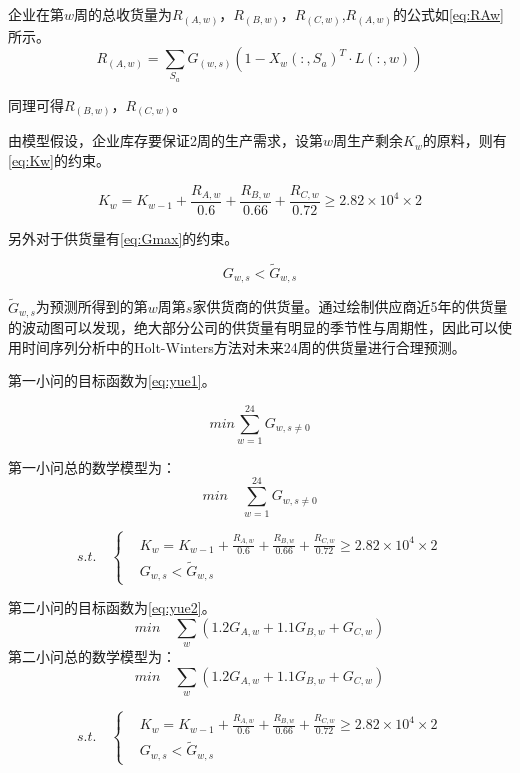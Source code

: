 \documentclass[withoutpreface,bwprint]{cumcmthesis} %
\begin{document}
企业在第$w$周的总收货量为$R_(A,w)$，$R_(B,w)$，$R_(C,w)$,$R_(A,w)$的公式如\cref{eq:RAw}所示。
\begin{equation}
R_(A,w)=\sum\limits_{S_a} G_(w,s)(1-X_w(:,S_a)^T\cdot L(:,w))
\label{eq:RAw}
\end{equation}

同理可得$R_(B,w)$，$R_(C,w)$。

由模型假设，企业库存要保证2周的生产需求，设第$w$周生产剩余$K_w$的原料，则有\cref{eq:Kw}的约束。

\begin{equation}
K_w=K_{w-1}+\frac{R_{A,w}}{0.6}+\frac{R_{B,w}}{0.66}+\frac{R_{C,w}}{0.72}\ge 2.82\times 10^4\times 2
\label{eq:Kw}
\end{equation}

另外对于供货量有\cref{eq:Gmax}的约束。

\begin{equation}
G_{w,s}<\widetilde{G}_{w,s}
\label{eq:Gmax}
\end{equation}

$\widetilde{G}_{w,s}$为预测所得到的第$w$周第$s$家供货商的供货量。通过绘制供应商近5年的供货量的波动图可以发现，绝大部分公司的供货量有明显的季节性与周期性，因此可以使用时间序列分析中的Holt-Winters方法对未来24周的供货量进行合理预测。

第一小问的目标函数为\cref{eq:yue1}。

\begin{equation}
min \sum\limits_{w=1}^24 G_{w,s\neq 0}
\label{eq:yue1}
\end{equation}

第一小问总的数学模型为：
\[
min \quad \sum\limits_{w=1}^{24} G_{w,s\neq 0}
\]

$$ s.t. \quad \left\{
\begin{aligned}
    & K_w=K_{w-1}+\frac{R_{A,w}}{0.6}+\frac{R_{B,w}}{0.66}+\frac{R_{C,w}}{0.72}\ge 2.82\times 10^4\times 2 \\
    & G_{w,s}<\widetilde{G}_{w,s}
\end{aligned}
\right.
$$

第二小问的目标函数为\cref{eq:yue2}。
\begin{equation}
min \quad \sum\limits_w(1.2G_{A,w}+1.1G_{B,w}+G_{C,w})
\label{eq:yue2}
\end{equation}
第二小问总的数学模型为：
\[
min \quad \sum\limits_w(1.2G_{A,w}+1.1G_{B,w}+G_{C,w})
\]

$$ s.t. \quad \left\{
\begin{aligned}
    & K_w=K_{w-1}+\frac{R_{A,w}}{0.6}+\frac{R_{B,w}}{0.66}+\frac{R_{C,w}}{0.72}\ge 2.82\times 10^4\times 2 \\
    & G_{w,s}<\widetilde{G}_{w,s}
\end{aligned}
\right.
$$
\end{document}
